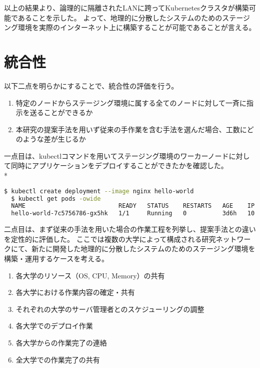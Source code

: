 以上の結果より、論理的に隔離されたLANに跨ってKubernetesクラスタが構築可能であることを示した。
よって、地理的に分散したシステムのためのステージング環境を実際のインターネット上に構築することが可能であることが言える。

\section{統合性}
\label{evaluation:method}

以下二点を明らかにすることで、統合性の評価を行う。

\begin{enumerate}
  \item 特定のノードからステージング環境に属する全てのノードに対して一斉に指示を送ることができるか
  \item 本研究の提案手法を用いず従来の手作業を含む手法を選んだ場合、工数にどのような差が生じるか
\end{enumerate}

一点目は、kubectlコマンドを用いてステージング環境のワーカーノードに対して同時にアプリケーションをデプロイすることができたかを確認した。\\*

\begin{lstlisting}[language=bash]
  $ kubectl create deployment --image nginx hello-world
  $ kubectl get pods -owide
  NAME                          READY   STATUS    RESTARTS   AGE    IP          NODE       NOMINATED NODE   READINESS GATES
  hello-world-7c5756786-gx5hk   1/1     Running   0          3d6h   10.44.0.1   master02   <none>           <none>
\end{lstlisting}

二点目は、まず従来の手法を用いた場合の作業工程を列挙し、提案手法との違いを定性的に評価した。
ここでは複数の大学によって構成される研究ネットワークにて、新たに開発した地理的に分散したシステムのためのステージング環境を構築・運用するケースを考える。

\begin{enumerate}
  \item 各大学のリソース（OS, CPU, Memory）の共有
  \item 各大学における作業内容の確定・共有
  \item それぞれの大学のサーバ管理者とのスケジューリングの調整
  \item 各大学でのデプロイ作業
  \item 各大学からの作業完了の連絡
  \item 全大学での作業完了の共有
\end{enumerate}

